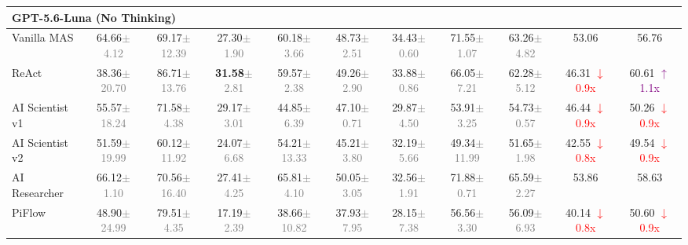 \documentclass{article}
\begin{document}
\begin{table}[!ht]
{\begin{tabular}{l | cc | cc | cc | cc | cc}
\midrule
\multicolumn{11}{l}{\textbf{GPT-5.6-Luna (No Thinking)}} \\
\midrule
Vanilla MAS & 64.66\textcolor{gray}{\tiny$\pm$4.12} & 69.17\textcolor{gray}{\tiny$\pm$12.39} & 27.30\textcolor{gray}{\tiny$\pm$1.90} & 60.18\textcolor{gray}{\tiny$\pm$3.66} & 48.73\textcolor{gray}{\tiny$\pm$2.51} & 34.43\textcolor{gray}{\tiny$\pm$0.60} & 71.55\textcolor{gray}{\tiny$\pm$1.07} & 63.26\textcolor{gray}{\tiny$\pm$4.82} & 53.06 & 56.76 \\
ReAct & 38.36\textcolor{gray}{\tiny$\pm$20.70} & 86.71\textcolor{gray}{\tiny$\pm$13.76} & \textbf{31.58}\textcolor{gray}{\tiny$\pm$2.81} & 59.57\textcolor{gray}{\tiny$\pm$2.38} & 49.26\textcolor{gray}{\tiny$\pm$2.90} & 33.88\textcolor{gray}{\tiny$\pm$0.86} & 66.05\textcolor{gray}{\tiny$\pm$7.21} & 62.28\textcolor{gray}{\tiny$\pm$5.12} & 46.31 \textcolor{red}{\small $\downarrow$ 0.9x} & 60.61 \textcolor{purple}{\small $\uparrow$ 1.1x} \\
AI Scientist v1 & 55.57\textcolor{gray}{\tiny$\pm$18.24} & 71.58\textcolor{gray}{\tiny$\pm$4.38} & 29.17\textcolor{gray}{\tiny$\pm$3.01} & 44.85\textcolor{gray}{\tiny$\pm$6.39} & 47.10\textcolor{gray}{\tiny$\pm$0.71} & 29.87\textcolor{gray}{\tiny$\pm$4.50} & 53.91\textcolor{gray}{\tiny$\pm$3.25} & 54.73\textcolor{gray}{\tiny$\pm$0.57} & 46.44 \textcolor{red}{\small $\downarrow$ 0.9x} & 50.26 \textcolor{red}{\small $\downarrow$ 0.9x} \\
AI Scientist v2 & 51.59\textcolor{gray}{\tiny$\pm$19.99} & 60.12\textcolor{gray}{\tiny$\pm$11.92} & 24.07\textcolor{gray}{\tiny$\pm$6.68} & 54.21\textcolor{gray}{\tiny$\pm$13.33} & 45.21\textcolor{gray}{\tiny$\pm$3.80} & 32.19\textcolor{gray}{\tiny$\pm$5.66} & 49.34\textcolor{gray}{\tiny$\pm$11.99} & 51.65\textcolor{gray}{\tiny$\pm$1.98} & 42.55 \textcolor{red}{\small $\downarrow$ 0.8x} & 49.54 \textcolor{red}{\small $\downarrow$ 0.9x} \\
AI Researcher & 66.12\textcolor{gray}{\tiny$\pm$1.10} & 70.56\textcolor{gray}{\tiny$\pm$16.40} & 27.41\textcolor{gray}{\tiny$\pm$4.25} & 65.81\textcolor{gray}{\tiny$\pm$4.10} & 50.05\textcolor{gray}{\tiny$\pm$3.05} & 32.56\textcolor{gray}{\tiny$\pm$1.91} & 71.88\textcolor{gray}{\tiny$\pm$0.71} & 65.59\textcolor{gray}{\tiny$\pm$2.27} & 53.86 & 58.63 \\
PiFlow & 48.90\textcolor{gray}{\tiny$\pm$24.99} & 79.51\textcolor{gray}{\tiny$\pm$4.35} & 17.19\textcolor{gray}{\tiny$\pm$2.39} & 38.66\textcolor{gray}{\tiny$\pm$10.82} & 37.93\textcolor{gray}{\tiny$\pm$7.95} & 28.15\textcolor{gray}{\tiny$\pm$7.38} & 56.56\textcolor{gray}{\tiny$\pm$3.30} & 56.09\textcolor{gray}{\tiny$\pm$6.93} & 40.14 \textcolor{red}{\small $\downarrow$ 0.8x} & 50.60 \textcolor{red}{\small $\downarrow$ 0.9x} \\

\end{tabular}}
\end{table}
\end{document}
